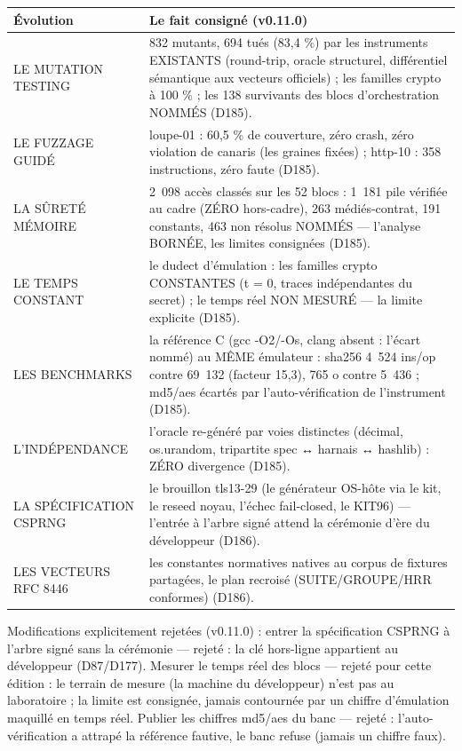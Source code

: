 \begin{table}[tbp]
\centering
\small
\begin{tabularx}{\textwidth}{>{\raggedright\arraybackslash}p{3.4cm} X}
\textbf{Évolution} & \textbf{Le fait consigné (v0.11.0)} \\
\midrule
LE MUTATION TESTING & 832 mutants, 694 tués (83,4 \%) par les instruments
EXISTANTS (round-trip, oracle structurel, différentiel sémantique aux
vecteurs officiels) ; les familles crypto à 100 \% ; les 138 survivants
des blocs d'orchestration NOMMÉS (D185). \\
LE FUZZAGE GUIDÉ & loupe-01 : 60,5 \% de couverture, zéro crash, zéro
violation de canaris (les graines fixées) ; http-10 : 358 instructions,
zéro faute (D185). \\
LA SÛRETÉ MÉMOIRE & 2~098 accès classés sur les 52 blocs : 1~181 pile
vérifiée au cadre (ZÉRO hors-cadre), 263 médiés-contrat, 191 constants,
463 non résolus NOMMÉS — l'analyse BORNÉE, les limites consignées (D185). \\
LE TEMPS CONSTANT & le dudect d'émulation : les familles crypto
CONSTANTES (t = 0, traces indépendantes du secret) ; le temps réel
NON MESURÉ — la limite explicite (D185). \\
LES BENCHMARKS & la référence C (gcc -O2/-Os, clang absent : l'écart
nommé) au MÊME émulateur : sha256 4~524 ins/op contre 69~132 (facteur
15,3), 765 o contre 5~436 ; md5/aes écartés par l'auto-vérification
de l'instrument (D185). \\
L'INDÉPENDANCE & l'oracle re-généré par voies distinctes (décimal,
os.urandom, tripartite spec ↔ harnais ↔ hashlib) : ZÉRO divergence (D185). \\
LA SPÉCIFICATION CSPRNG & le brouillon tls13-29 (le générateur OS-hôte
via le kit, le reseed noyau, l'échec fail-closed, le KIT96) — l'entrée
à l'arbre signé attend la cérémonie d'ère du développeur (D186). \\
LES VECTEURS RFC 8446 & les constantes normatives natives au corpus de
fixtures partagées, le plan recroisé (SUITE/GROUPE/HRR conformes) (D186). \\
\end{tabularx}
\end{table}

Modifications explicitement rejetées (v0.11.0) : entrer la spécification
CSPRNG à l'arbre signé sans la cérémonie — rejeté : la clé hors-ligne
appartient au développeur (D87/D177). Mesurer le temps réel des blocs —
rejeté pour cette édition : le terrain de mesure (la machine du
développeur) n'est pas au laboratoire ; la limite est consignée, jamais
contournée par un chiffre d'émulation maquillé en temps réel. Publier
les chiffres md5/aes du banc — rejeté : l'auto-vérification a attrapé
la référence fautive, le banc refuse (jamais un chiffre faux).

